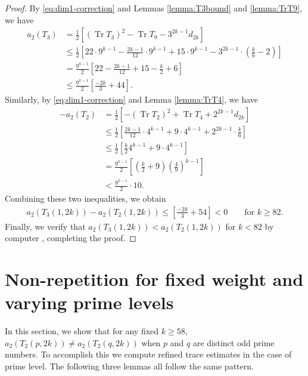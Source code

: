 \documentclass[11pt,letterpaper,reqno]{amsart}
\numberwithin{figure}{section}
\numberwithin{table}{section}
\theoremstyle{definition}
\theoremstyle{plain}
\newcommand{\lrp}[1]{\left(#1\right)}
\newcommand{\lrb}[1]{\left[#1\right]}
\theoremstyle{definition}
\theoremstyle{definition}
\theoremstyle{remark}
\numberwithin{equation}{section}
\DeclareMathOperator{\Tr}{Tr}
\begin{document}
\begin{proof}
    By \eqref{eq:dim1-correction} and Lemmas \ref{lemma:T3bound} and \ref{lemma:TrT9}, we have 
    \begin{align}
        a_2(T_3) &= \frac{1}{2}\left[(\Tr T_3)^2-\Tr T_9 -3^{2k-1}d_{2k}\right] \\
        &\leq \frac{1}{2}\left[
        22 \cdot 9^{k-1}
        - \frac{2k-1}{12} \cdot 9^{k-1} + 15 \cdot 9^{k-1}
        - 3^{2k-1} \cdot \lrp{\frac{k}{6} - 2} \right] \\
        &= \frac{9^{k-1}}{2}\left[
        22
        - \frac{2k-1}{12}  + 15
        -  \frac{k}{2} + 6 \right] \\
        &\leq \frac{9^{k-1}}{2}\left[
        \frac{-2k}{3} + 44 \right].
    \end{align}
    Similarly, by \eqref{eq:dim1-correction} and Lemma \ref{lemma:TrT4}, we have 
    \begin{align}
        -a_2(T_2) &= \frac{1}{2}\left[-(\Tr T_2)^2+\Tr T_4 +2^{2k-1}d_{2k}\right] \\
        &\leq \frac{1}{2}\left[
        \frac{2k-1}{12} \cdot 4^{k-1} + 9 \cdot 4^{k-1}
        + 2^{2k-1} \cdot \frac{k}{6}  \right] \\
        &\leq \frac{1}{2}\left[
        \frac{k}{2} 4^{k-1} + 9 \cdot 4^{k-1}  \right] \\
        &= \frac{9^{k-1}}{2}\left[
        \lrp{\frac{k}{2}+9} \lrp{\frac49}^{k-1}   \right] \\
        &< \frac{9^{k-1}}{2} \cdot 10.
    \end{align}
    Combining these two inequalities, we obtain
    \begin{align}
        a_2(T_3(1,2k)) - a_2(T_2(1,2k)) \leq \lrb{\frac{-2k}{3} + 54} < 0 \qquad \text{for } k \geq 82.
    \end{align}
    Finally, we verify that $a_2(T_3(1,2k))< a_2(T_2(1,2k))$ for $k < 82$ by computer \cite{ross-code}, completing the proof. 
\end{proof}







\section{Non-repetition for fixed weight and varying prime levels} \label{sect:primelevel}

In this section, we show that for any fixed $k\geq58$, $a_2(T_2(p,2k))\neq a_2(T_2(q,2k))$ when $p$ and $q$ are distinct odd prime numbers. To accomplish this we compute refined trace estimates in the case of prime level. The following three lemmas all follow the same pattern. 
\end{document}
